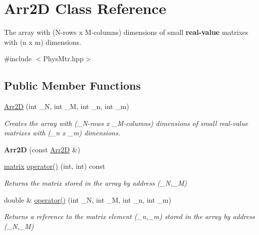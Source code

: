 \hypertarget{class_arr2_d}{}\section{Arr2D Class Reference}
\label{class_arr2_d}


The array with (N-\/rows x M-\/columns) dimensions of small {\bfseries real-\/value} matrixes with (n x m) dimensions.  




{\ttfamily \#include $<$Phys\+Mtr.\+hpp$>$}

\subsection*{Public Member Functions}
\begin{DoxyCompactItemize}
\item 
\mbox{\label{class_arr2_d_a207bbbf33b1873cbae1821988eedc91f}} 
\mbox{\hyperlink{class_arr2_d_a207bbbf33b1873cbae1821988eedc91f}{Arr2D}} (int \+\_\+N, int \+\_\+M, int \+\_\+n, int \+\_\+m)
\begin{DoxyCompactList}\small\item\em Creates the array with (\+\_\+\+N-\/rows x \+\_\+\+M-\/columns) dimensions of small real-\/value matrixes with (\+\_\+n x \+\_\+m) dimensions. \end{DoxyCompactList}\item 
\mbox{\label{class_arr2_d_a02978a25e92120e63eb8a6ccdce2f805}} 
{\bfseries Arr2D} (const \mbox{\hyperlink{class_arr2_d}{Arr2D}} \&)
\item 
\mbox{\label{class_arr2_d_afec92f155e77d207e24651e5c1848726}} 
\mbox{\hyperlink{classmatrix}{matrix}} \mbox{\hyperlink{class_arr2_d_afec92f155e77d207e24651e5c1848726}{operator()}} (int, int) const
\begin{DoxyCompactList}\small\item\em Returns the matrix stored in the array by address (\+\_\+N,\+\_\+M) \end{DoxyCompactList}\item 
\mbox{\label{class_arr2_d_a8fca0ac08f6d32d4ee98491b39f8dd91}} 
double \& \mbox{\hyperlink{class_arr2_d_a8fca0ac08f6d32d4ee98491b39f8dd91}{operator()}} (int \+\_\+N, int \+\_\+M, int \+\_\+n, int \+\_\+m)
\begin{DoxyCompactList}\small\item\em Returns a reference to the matrix element (\+\_\+n,\+\_\+m) stored in the array by address (\+\_\+N,\+\_\+M) \end{DoxyCompactList}\item 

\end{DoxyCompactItemize}
